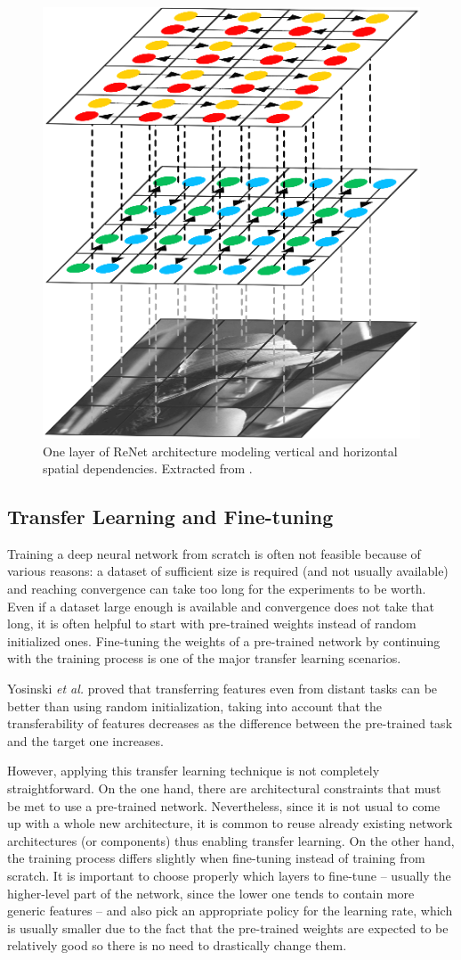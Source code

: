 \begin{figure}[!hbt]
	\centering
	\includegraphics[width=0.5\linewidth]{Figures/Segmentation/renet_rework.eps}
	\caption{One layer of ReNet architecture modeling vertical and horizontal spatial dependencies. Extracted from \cite{Visin2015}.}
	\label{fig:segmentation:renet}
\end{figure}

\subsection{Transfer Learning and Fine-tuning}

Training a deep neural network from scratch is often not feasible because of various reasons: a dataset of sufficient size is required (and not usually available) and reaching convergence can take too long for the experiments to be worth. Even if a dataset large enough is available and convergence does not take that long, it is often helpful to start with pre-trained weights instead of random initialized ones\cite{Ahmed2008}\cite{Oquab2014}. Fine-tuning the weights of a pre-trained network by continuing with the training process is one of the major transfer learning scenarios.

Yosinski \emph{et al.}\cite{Yosinski2014} proved that transferring features even from distant tasks can be better than using random initialization, taking into account that the transferability of features decreases as the difference between the pre-trained task and the target one increases.

However, applying this transfer learning technique is not completely straightforward. On the one hand, there are architectural constraints that must be met to use a pre-trained network. Nevertheless, since it is not usual to come up with a whole new architecture, it is common to reuse already existing network architectures (or components) thus enabling transfer learning. On the other hand, the training process differs slightly when fine-tuning instead of training from scratch. It is important to choose properly which layers to fine-tune -- usually the higher-level part of the network, since the lower one tends to contain more generic features -- and also pick an appropriate policy for the learning rate, which is usually smaller due to the fact that the pre-trained weights are expected to be relatively good so there is no need to drastically change them.

